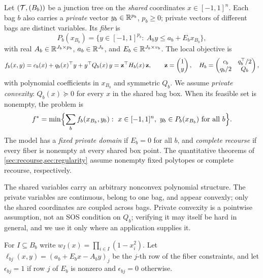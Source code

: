\begin{definition}\label{def:rec-model}
Let $(\mathcal{T},(B_b))$ be a junction tree on the \emph{shared} coordinates
$x\in[-1,1]^n$. Each bag $b$ also carries a \emph{private} vector
$y_b\in\mathbb{R}^{p_b}$, $p_b\ge0$; private vectors of different bags are
distinct variables. Its \emph{fiber} is
\begin{equation}\label{eq:rec-fiber}
  P_b(x_{B_b})=\bigl\{y\in[-1,1]^{p_b}:\ A_by\le a_b+E_bx_{B_b}\bigr\},
\end{equation}
with real $A_b\in\mathbb{R}^{J_b\times p_b}$, $a_b\in\mathbb{R}^{J_b}$, and
$E_b\in\mathbb{R}^{J_b\times v_b}$. The local objective is
\begin{equation}\label{eq:rec-objective}
  f_b(x,y)=c_b(x)+q_b(x)^{\top}y+y^{\top}Q_b(x)\,y
  =\mathbf{z}^{\top}H_b(x)\,\mathbf{z},\qquad
  \mathbf{z}=\begin{pmatrix}1\\y\end{pmatrix},\quad
  H_b=\begin{pmatrix}c_b&q_b^{\top}/2\\ q_b/2&Q_b\end{pmatrix},
\end{equation}
with polynomial coefficients in $x_{B_b}$ and symmetric $Q_b$. We assume
\emph{private convexity}: $Q_b(x)\succeq0$ for every $x$ in the shared bag
box. When its feasible set is nonempty, the problem is
\[
  \fstar=\min\Bigl\{\sum_bf_b(x_{B_b},y_b):\ x\in[-1,1]^n,\
  y_b\in P_b(x_{B_b})\text{ for all }b\Bigr\}.
\]
The model has a \emph{fixed private domain} if $E_b=0$ for all $b$, and
\emph{complete recourse} if every fiber is nonempty at every shared box
point. The quantitative theorems of \cref{sec:recourse,sec:regularity}
assume nonempty fixed polytopes or complete recourse, respectively.
\end{definition}

The shared variables carry an arbitrary nonconvex polynomial structure. The
private variables are continuous, belong to one bag, and appear convexly;
only the shared coordinates are coupled across bags. Private convexity is
a pointwise assumption, not an SOS condition on $Q_b$; verifying it may
itself be hard in general, and we use it only where an application supplies
it.

For $I\subseteq B_b$ write $w_I(x)=\prod_{i\in I}(1-x_i^2)$. Let
$\ell_{bj}(x,y)=(a_b+E_bx-A_by)_j$ be the $j$-th row of the fiber
constraints, and let $\epsilon_{bj}=1$ if row $j$ of $E_b$ is nonzero and
$\epsilon_{bj}=0$ otherwise.

